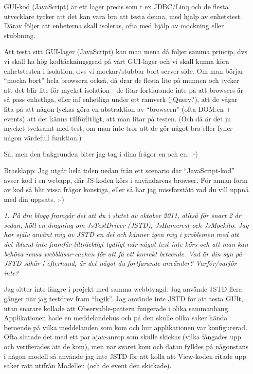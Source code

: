 \documentclass[11pt]{article}
\begin{document}
GUI-kod (JavaScript) är ett lager precis som t ex JDBC/Linq och de
flesta utvecklare tycker att det kan vara bra att testa denna, med hjälp
av enhetstest. Därav följer att enheterna skall isoleras, ofta med hjälp
av mockning eller stubbning.

Att testa sitt GUI-lager (JavaScript) kan man mena då följer samma
princip, dvs vi skall ha hög kodtäckningsgrad på vårt GUI-lager och vi
skall kunna köra enhetstesten i isolation, dvs vi mockar/stubbar bort
server side. Om man börjar ``mocka bort'' hela browsern också, då drar de
flesta lite på munnen och tycker att det blir lite för mycket isolation
- de litar fortfarande inte på att browsers är så pass enhetliga, eller
iaf enhetliga under ett ramverk (jQuery?), att de vågar lita på att
någon lyckas göra en abstraktion av ``browsern'' (ofta DOM:en + events)
att det känns tillförlitligt, att man litar på testen. (Och då är det ju
mycket tveksamt med test, om man inte tror att de gör något bra eller
fyller någon värdefull funktion.)

Så, men den bakgrunden biter jag tag i dina frågor en och en. :-)

Brasklapp: Jag utgår hela tiden nedan från ett scenario där
``JavaScript-kod'' avser kod i en webapp, där JS-koden körs i användarens
browser. För annan form av kod så blir vissa frågor konstiga, eller så
har jag missförstått vad du vill uppnå med din uppsats. :-)

\emph{1. På din blogg framgår det att du i slutet av oktober 2011, alltså för
snart 2 år sedan, höll en dragning om JsTestDriver (JSTD), JsHamcrest
och JsMockito. Jag har själv använt mig av JSTD en del och känner igen
mig i problemen med att det ibland inte framfår tillräckligt tydligt
när något test inte körs och att man kan behöva rensa webbläsar-cachen
för att få ett korrekt beteende. Vad är din syn på JSTD såhär i
efterhand, är det något du fortfarande använder? Varför/varför inte?}

Jag sitter inte längre i projekt med samma webbtyngd. Jag använde JSTD
flera gånger när jag testdrev fram ``logik''. Jag använde inte JSTD för
att testa GUIt, utan snarare kollade att Observable-pattern fungerade i
olika sammanhang. Applikationen hade en meddelandebus och på den skulle
olika saker hända beroende på vilka meddelanden som kom och hur
applikationen var konfigurerad. Ofta slutade det med ett par ajax-anrop
som skulle skickas (vilka fångades upp och verifierades att de kom), men
när svaret kom och datan fylldes på någonstans i någon modell så använde
jag inte JSTD för att kolla att View-koden ritade upp saker rätt utifrån
Modellen (och de event den skickade).
\end{document}
